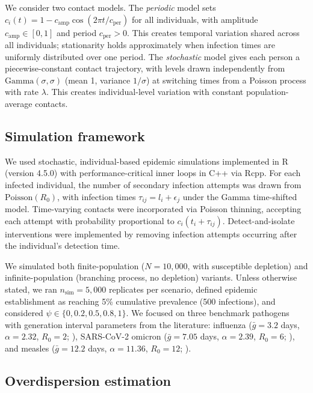 \documentclass[10pt]{article}
\begin{document}
We consider two contact models. The \textit{periodic} model sets $c_i(t) = 1 - c_\text{amp}\cos(2\pi t / c_\text{per})$ for all individuals, with amplitude $c_\text{amp} \in [0,1]$ and period $c_\text{per} > 0$. This creates temporal variation shared across all individuals; stationarity holds approximately when infection times are uniformly distributed over one period. The \textit{stochastic} model gives each person a piecewise-constant contact trajectory, with levels drawn independently from $\text{Gamma}(\sigma, \sigma)$ (mean 1, variance $1/\sigma$) at switching times from a Poisson process with rate $\lambda$. This creates individual-level variation with constant population-average contacts.

\subsection{Simulation framework}

We used stochastic, individual-based epidemic simulations implemented in R (version 4.5.0) with performance-critical inner loops in C++ via Rcpp. For each infected individual, the number of secondary infection attempts was drawn from $\text{Poisson}(R_0)$, with infection times $\tau_{ij} = l_i + \epsilon_j$ under the Gamma time-shifted model. Time-varying contacts were incorporated via Poisson thinning, accepting each attempt with probability proportional to $c_i(t_i + \tau_{ij})$. Detect-and-isolate interventions were implemented by removing infection attempts occurring after the individual's detection time.

We simulated both finite-population ($N = 10{,}000$, with susceptible depletion) and infinite-population (branching process, no depletion) variants. Unless otherwise stated, we ran $n_\text{sim} = 5{,}000$ replicates per scenario, defined epidemic establishment as reaching 5\% cumulative prevalence (500 infections), and considered $\psi \in \{0, 0.2, 0.5, 0.8, 1\}$. We focused on three benchmark pathogens with generation interval parameters from the literature: influenza ($\bar{g} = 3.2$ days, $\alpha = 2.32$, $R_0 = 2$; \citealt{chan_estimating_2025}), SARS-CoV-2 omicron ($\bar{g} = 7.05$ days, $\alpha = 2.39$, $R_0 = 6$; \citealt{manica_intrinsic_2022}), and measles ($\bar{g} = 12.2$ days, $\alpha = 11.36$, $R_0 = 12$; \citealt{klinkenberg_correlation_2011}).

\subsection{Overdispersion estimation}
\end{document}
